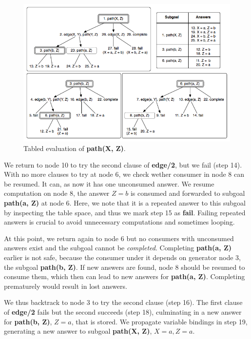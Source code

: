 \begin{figure}[ht]
  \centering
    \includegraphics[scale=0.6]{tabling_path.png}
  \caption{Tabled evaluation of \textbf{path(X, Z)}.}
  \label{fig:tabling_path}
\end{figure}

We return to node 10 to try the second clause of \textbf{edge/2}, but we fail (step 14). With no more clauses to try at node 6,
we check wether consumer in node 8 can be resumed. It can, as now it has one unconsumed answer. We resume computation on node 8,
the answer $Z = b$ is consumed and forwarded to subgoal \textbf{path(a, Z)} at node 6. Here, we note that it is a repeated answer
to this subgoal by inspecting the table space, and thus we mark step 15 as \textbf{fail}. Failing repeated answers is crucial
to avoid unnecessary computations and sometimes looping.

At this point, we return again to node 6 but no consumers with unconsumed answers exist and the subgoal cannot be \textit{completed}.
Completing \textbf{path(a, Z)} earlier is not safe, because the consumer under it depends on generator node 3, the subgoal \textbf{path(b, Z)}.
If new answers are found, node 8 should be resumed to consume them, which then can lead to new answers for \textbf{path(a, Z)}.
Completing prematurely would result in lost answers.

We thus backtrack to node 3
to try the second clause (step 16). The first clause of \textbf{edge/2} fails but the second succeeds (step 18), culminating in
a new answer for \textbf{path(b, Z)}, $Z = a$, that is stored. We propagate variable bindings in step 19, generating a new answer
to subgoal \textbf{path(X, Z)}, $X = a, Z = a$.

